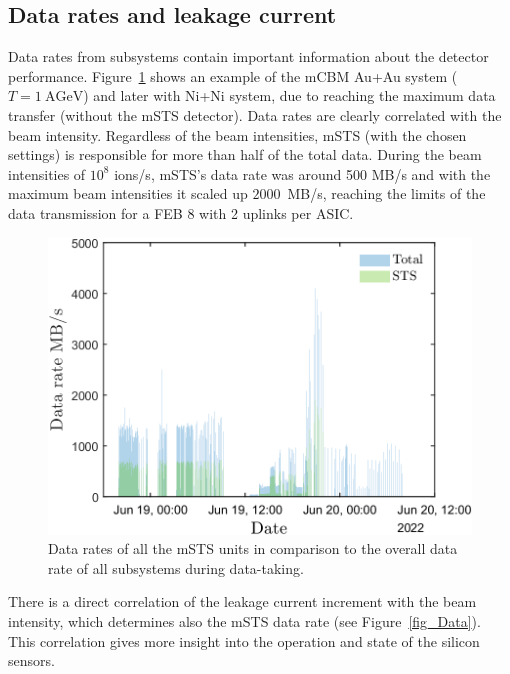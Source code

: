 \subsection{Data rates and leakage current}
Data rates from subsystems contain important information about the detector performance. Figure~\ref{fig_data_rates_Ag} shows an example of the \gls{mCBM} Au+Au system ($T= 1~\mathrm{AGeV}$) and later with Ni+Ni system, due to reaching the maximum data transfer (without the \gls{mSTS} detector). Data rates are clearly correlated with the beam intensity. Regardless of the beam intensities, \gls{mSTS} (with the chosen settings) is responsible for more than half of the total data. During the beam intensities of $10^{8}$ ions/s, \gls{mSTS}'s data rate was around 500 MB/s and with the maximum beam intensities it scaled up $2000$~MB/s, reaching the limits of the data transmission for a \gls{FEB} 8 with 2 uplinks per \gls{ASIC}. 
\begin{figure}[H]
\centering
\includegraphics[width=0.6\columnwidth]{Chapter6/DCS/images/rates/Ag_total.png}
\caption{Data rates of all the \gls{mSTS} units in comparison to the overall data rate of all subsystems during data-taking.}
\label{fig_data_rates_Ag}
\end{figure}
There is a direct correlation of the leakage current increment with the beam intensity, which determines also the \gls{mSTS} data rate (see Figure~\ref{fig_Data}). This correlation gives more insight into the operation and state of the silicon sensors.
